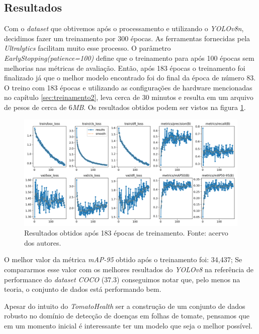 \subsection{Resultados}
\label{sec:resultados}
Com o \emph{dataset} que obtivemos após o processamento e utilizando o \emph{YOLOv8n}, decidimos fazer um treinamento por 300 épocas. As ferramentas fornecidas pela \emph{Ultralytics} facilitam muito esse processo. O parâmetro \emph{EarlyStopping(patience=100)} define que o treinamento para após 100 épocas sem melhorias nas métricas de avaliação. Então, após 183 épocas o treinamento foi finalizado já que o melhor modelo encontrado foi do final da época de número 83. O treino com 183 épocas e utilizando as configurações de hardware mencionadas no capítulo \ref{sec:treinamento2}, leva cerca de 30 minutos e resulta em um arquivo de pesos de cerca de 6\emph{MB}. Os resultados obtidos podem ser vistos na figura \ref{fig:resultados-treinamento}.

\begin{figure}[htb!]
    \centering
    \includegraphics[width=1\linewidth]{images/results.png}
    \caption{Resultados obtidos após 183 épocas de treinamento. Fonte: acervo dos autores.}
    \label{fig:resultados-treinamento}
\end{figure}

O melhor valor da métrica \emph{mAP-95} obtido após o treinamento foi: 34,437; Se compararmos esse valor com os melhores resultados do \emph{YOLOv8} na referência de performance do \emph{dataset COCO} (37.3) conseguimos notar que, pelo menos na teoria, o conjunto de dados está performando bem.

Apesar do intuito do \emph{TomatoHealth} ser a construção de um conjunto de dados robusto no domínio de detecção de doenças em folhas de tomate, pensamos que em um momento inicial é interessante ter um modelo que seja o melhor possível. 

